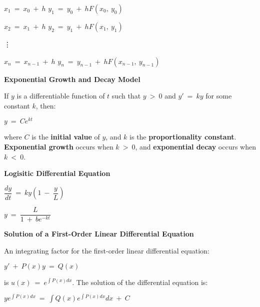 \documentclass{article}
\begin{document}
\begin{large}
\hspace{0.2in} {\large $x_{1}\ =\ x_{0}\ +\ h$ \phantom{ } \phantom{ } \phantom{ } $y_{1}\ =\ y_{0}\ +\ hF(x_{0},\ y_{0})$}

\hspace{0.2in} {\large $x_{2}\ =\ x_{1}\ +\ h$ \phantom{ } \phantom{ } \phantom{ } $y_{2}\ =\ y_{1}\ +\ hF(x_{1},\ y_{1})$}

\hspace{0.2in} \phantom{ } \vdots

\vspace{-0.4in}
\hspace{0.2in} {\large $x_{n}\ =\ x_{n-1}\ +\ h$ \phantom{ } \phantom{ } \phantom{ } $y_{n}\ =\ y_{n-1}\ +\ hF(x_{n-1},\ y_{n-1})$}


\textbf{Exponential Growth and Decay Model}

\hspace{0.1in} {\large If $y$ is a differentiable function of $t$ such that $y\ >\ 0$ and $y'\ =\ ky$ for some constant $k$, then:}

\vspace{-0.1in}
\hspace{2.7in} $y\ =\ Ce^{kt}$

\hspace{0.1in} {\large where $C$ is the \textbf{initial value} of $y$, and $k$ is the \textbf{proportionality constant}.  \textbf{Exponential growth} occurs when $k\ >\ 0$, and \textbf{exponential decay} occurs when $k\ <\ 0$.}

\textbf{Logisitic Differential Equation}

\hspace{2.5in} $\dfrac{dy}{dt}\ =\ ky\left(1\ -\ \dfrac{y}{L}\right)$

\hspace{2.5in} $y\ =\ \dfrac{L}{1\ +\ be^{-kt}}$

\textbf{Solution of a First-Order Linear Differential Equation}

\hspace{0.1in} An integrating factor for the first-order linear differential equation:

\hspace{2.0in} $y'\ +\ P(x)y\ =\ Q(x)$

\hspace{0.1in} is $u(x)\ =\ e^{\int P(x)dx}$.  The solution of the differential equation is:

\hspace{1.5in} $ye^{\int P(x)dx}\ =\ \displaystyle\int Q(x)e^{\int P(x)dx}dx\ +\ C$


\end{large}
\end{document}

